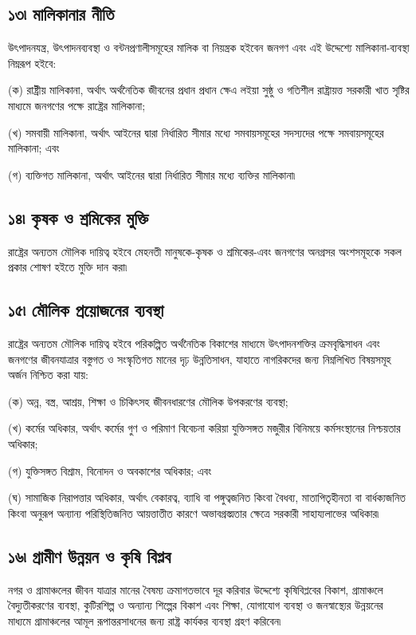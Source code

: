 \documentclass[11pt]{article}
\begin{document}
\subsection{১৩৷ মালিকানার নীতি}
\label{sec:org6cb1cf7}
উৎপাদনযন্ত্র, উৎপাদনব্যবস্থা ও বন্টনপ্রণালীসমূহের মালিক বা নিয়ন্ত্রক হইবেন
জনগণ এবং এই উদ্দেশ্যে মালিকানা-ব্যবস্থা নিম্নরূপ হইবে:

(ক) রাষ্ট্রীয় মালিকানা, অর্থাৎ অর্থনৈতিক জীবনের প্রধান প্রধান ক্ষেএ লইয়া সুষ্ঠু
    ও গতিশীল রাষ্ট্রায়ত্ত সরকারী খাত সৃষ্টির মাধ্যমে জনগণের পক্ষে রাষ্ট্রের
    মালিকানা;

(খ) সমবায়ী মালিকানা, অর্থাৎ আইনের দ্বারা নির্ধারিত সীমার মধ্যে সমবায়সমূহের
    সদস্যদের পক্ষে সমবায়সমূহের মালিকানা; এবং

(গ) ব্যক্তিগত মালিকানা, অর্থাৎ আইনের দ্বারা নির্ধারিত সীমার মধ্যে ব্যক্তির
    মালিকানা৷

\subsection{১৪৷ কৃষক ও শ্রমিকের মুক্তি}
\label{sec:orgedc58dc}
রাষ্ট্রের অন্যতম মৌলিক দায়িত্ব হইবে মেহনতী মানুষকে-কৃষক ও শ্রমিকের-এবং জনগণের
অনগ্রসর অংশসমূহকে সকল প্রকার শোষণ হইতে মুক্তি দান করা৷

\subsection{১৫৷ মৌলিক প্রয়োজনের ব্যবস্থা}
\label{sec:orgf9a54c9}
রাষ্ট্রের অন্যতম মৌলিক দায়িত্ব হইবে পরিকল্পিত অর্থনৈতিক বিকাশের মাধ্যমে
উৎপাদনশক্তির ক্রমবৃদ্ধিসাধন এবং জনগণের জীবনযাত্রার বস্তুগত ও সংস্কৃতিগত মানের
দৃঢ় উন্নতিসাধন, যাহাতে নাগরিকদের জন্য নিম্নলিখিত বিষয়সমূহ অর্জন নিশ্চিত করা
যায়:

(ক) অন্ন, বস্ত্র, আশ্রয়, শিক্ষা ও চিকিৎসহ জীবনধারণের মৌলিক উপকরণের ব্যবস্থা;

(খ) কর্মের অধিকার, অর্থাৎ কর্মের গুণ ও পরিমাণ বিবেচনা করিয়া যুক্তিসঙ্গত মজুরীর
    বিনিময়ে কর্মসংস্থানের নিশ্চয়তার অধিকার;

(গ) যুক্তিসঙ্গত বিশ্রাম, বিনোদন ও অবকাশের অধিকার; এবং

(ঘ) সামাজিক নিরাপত্তার অধিকার, অর্থাৎ বেকারত্ব, ব্যাধি বা পঙ্গুত্বজনিত কিংবা
    বৈধব্য, মাতাপিতৃহীনতা বা বার্ধক্যজনিত কিংবা অনুরূপ অন্যান্য পরিস্থিতিজনিত
    আয়ত্তাতীত কারণে অভাবগ্রস্ত্মতার ক্ষেত্রে সরকারী সাহায্যলাভের অধিকার৷

\subsection{১৬৷ গ্রামীণ উন্নয়ন ও কৃষি বিপ্লব}
\label{sec:orgfd7c082}
নগর ও গ্রামাঞ্চলের জীবন যাত্রার মানের বৈষম্য ক্রমাগতভাবে দূর করিবার উদ্দেশ্যে
কৃষিবিপ্লবের বিকাশ, গ্রামাঞ্চলে বৈদ্যুতীকরণের ব্যবস্থা, কুটিরশিল্প ও অন্যান্য
শিল্পের বিকাশ এবং শিক্ষা, যোগাযোগ ব্যবস্থা ও জনস্বাস্থ্যের উন্নয়নের মাধ্যমে
গ্রামাঞ্চলের আমূল রূপান্তরসাধনের জন্য রাষ্ট্র কার্যকর ব্যবস্থা গ্রহণ করিবেন৷
\end{document}
